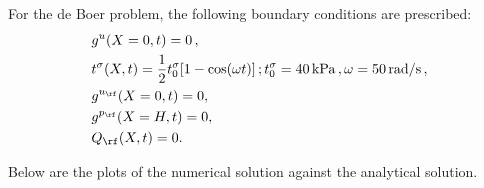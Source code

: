 For the de Boer problem, the following boundary conditions are prescribed:
\begin{align}
\label{eq:deBoer-BCs-1D}
    \begin{aligned}
        &g^u(X=0,t) = 0\, ,\\
        &t^\sigma(X,t) = \frac{1}{2}t_0^\sigma[1 - \cos(\omega t)] \, ; t_0^\sigma = 40\, \rm{kPa}\, , \omega = 50\, \rm{rad/s}\, ,\\
        &g^{u_\rf}(X = 0,t) = 0 ,\\
        &g^{p_\rf}(X = H,t) = 0 ,\\
        &Q_\rf(X,t) = 0 .
    \end{aligned}
\end{align}

Below are the plots of the numerical solution against the analytical solution.

